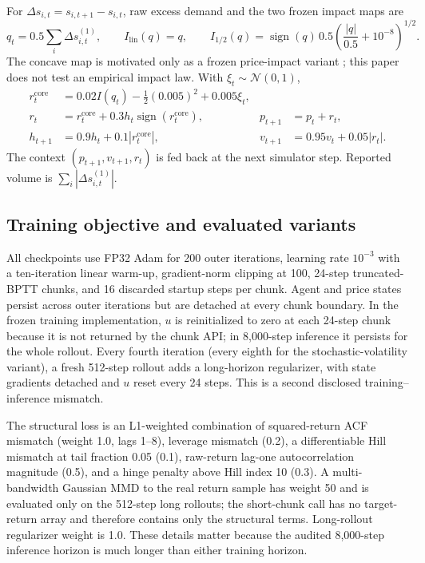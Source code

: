 \documentclass{article}
\begin{document}
For $\Delta s_{i,t}=s_{i,t+1}-s_{i,t}$, raw excess demand and the two frozen impact maps are
\begin{equation}
q_t=0.5\sum_i\Delta s^{(1)}_{i,t},\qquad
I_{\mathrm{lin}}(q)=q,\qquad
I_{1/2}(q)=\operatorname{sign}(q)\,0.5
 \left(\frac{|q|}{0.5}+10^{-8}\right)^{1/2}.
\end{equation}
The concave map is motivated only as a frozen price-impact variant
\citep{toth2011}; this paper does not test an empirical impact law. With $\xi_t\sim\mathcal{N}(0,1)$,
\begin{align}
r_t^{\mathrm{core}}&=0.02I(q_t)-\tfrac12(0.005)^2+0.005\xi_t,\\
r_t&=r_t^{\mathrm{core}}+0.3h_t\operatorname{sign}(r_t^{\mathrm{core}}),
&p_{t+1}&=p_t+r_t,\\
h_{t+1}&=0.9h_t+0.1|r_t^{\mathrm{core}}|,
&v_{t+1}&=0.95v_t+0.05|r_t|.
\end{align}
The context $(p_{t+1},v_{t+1},r_t)$ is fed back at the next simulator step. Reported volume is
$\sum_i|\Delta s^{(1)}_{i,t}|$.

\subsection{Training objective and evaluated variants}

All checkpoints use FP32 Adam for 200 outer iterations, learning rate $10^{-3}$ with a ten-iteration
linear warm-up, gradient-norm clipping at 100, 24-step truncated-BPTT chunks, and 16 discarded
startup steps per chunk. Agent and price states persist across outer iterations but are detached at
every chunk boundary. In the frozen training implementation, $u$ is reinitialized to zero at each
24-step chunk because it is not returned by the chunk API; in 8,000-step inference it persists for
the whole rollout. Every fourth iteration (every eighth for the stochastic-volatility variant), a
fresh 512-step rollout adds a long-horizon regularizer, with state gradients detached and $u$ reset
every 24 steps. This is a second disclosed training--inference mismatch.

The structural loss is an L1-weighted combination of squared-return ACF mismatch (weight 1.0, lags
1--8), leverage mismatch (0.2), a differentiable Hill mismatch at tail fraction 0.05 (0.1), raw-return
lag-one autocorrelation magnitude (0.5), and a hinge penalty above Hill index 10 (0.3). A
multi-bandwidth Gaussian MMD to the real return sample has weight 50 and is evaluated only on the
512-step long rollouts; the short-chunk call has no target-return array and therefore contains only
the structural terms. Long-rollout regularizer weight is 1.0. These details matter because the
audited 8,000-step inference horizon is much longer than either training horizon.
\end{document}
